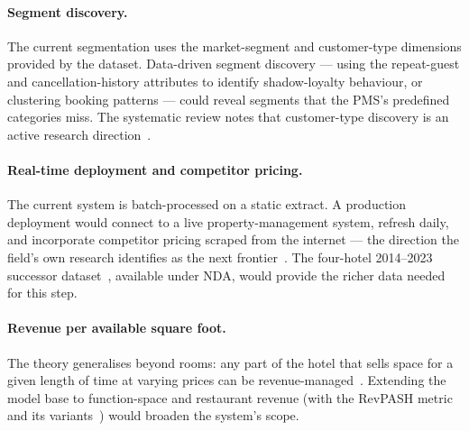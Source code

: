 \paragraph{Segment discovery.}
The current segmentation uses the market-segment and customer-type dimensions provided by the dataset. Data-driven segment discovery --- using the repeat-guest and cancellation-history attributes to identify shadow-loyalty behaviour, or clustering booking patterns --- could reveal segments that the PMS's predefined categories miss. The systematic review notes that customer-type discovery is an active research direction~\cite{jawabreh2026}.

\paragraph{Real-time deployment and competitor pricing.}
The current system is batch-processed on a static extract. A production deployment would connect to a live property-management system, refresh daily, and incorporate competitor pricing scraped from the internet --- the direction the field's own research identifies as the next frontier~\cite{pimentel2019,jawabreh2026}. The four-hotel 2014--2023 successor dataset~\cite{silvestre2025}, available under NDA, would provide the richer data needed for this step.

\paragraph{Revenue per available square foot.}
The theory generalises beyond rooms: any part of the hotel that sells space for a given length of time at varying prices can be revenue-managed~\cite{anderson2012}. Extending the model base to function-space and restaurant revenue (with the RevPASH metric and its variants~\cite{yeoman2024}) would broaden the system's scope.
